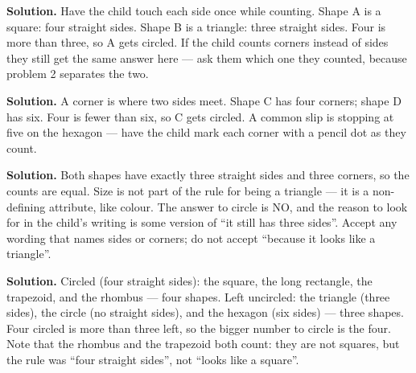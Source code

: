 \documentclass[12pt]{article}
\begin{document}



\textbf{Solution.} Have the child touch each side once while counting. Shape A is a square: four straight sides. Shape B is a triangle: three straight sides. Four is more than three, so A gets circled. If the child counts corners instead of sides they still get the same answer here --- ask them which one they counted, because problem 2 separates the two.



\textbf{Solution.} A corner is where two sides meet. Shape C has four corners; shape D has six. Four is fewer than six, so C gets circled. A common slip is stopping at five on the hexagon --- have the child mark each corner with a pencil dot as they count.



\textbf{Solution.} Both shapes have exactly three straight sides and three corners, so the counts are equal. Size is not part of the rule for being a triangle --- it is a non-defining attribute, like colour. The answer to circle is NO, and the reason to look for in the child's writing is some version of ``it still has three sides''. Accept any wording that names sides or corners; do not accept ``because it looks like a triangle''.



\textbf{Solution.} Circled (four straight sides): the square, the long rectangle, the trapezoid, and the rhombus --- four shapes. Left uncircled: the triangle (three sides), the circle (no straight sides), and the hexagon (six sides) --- three shapes. Four circled is more than three left, so the bigger number to circle is the four. Note that the rhombus and the trapezoid both count: they are not squares, but the rule was ``four straight sides'', not ``looks like a square''.
\end{document}
